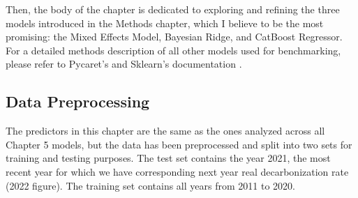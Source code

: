 Then, the body of the chapter is dedicated to exploring and refining the three models introduced in the Methods chapter, which I believe to be the most promising: the Mixed Effects Model, Bayesian Ridge, and CatBoost Regressor. For a detailed methods description of all other models used for benchmarking, please refer to Pycaret's and Sklearn's documentation \cite{pycaret,scikit-learn}.


\subsection{Data Preprocessing}
The predictors in this chapter are the same as the ones analyzed across all Chapter 5 models, but the data has been preprocessed and split into two sets for training and testing purposes. The test set contains the year 2021, the most recent year for which we have corresponding next year real decarbonization rate (2022 figure). The training set contains all years from 2011 to 2020. 

